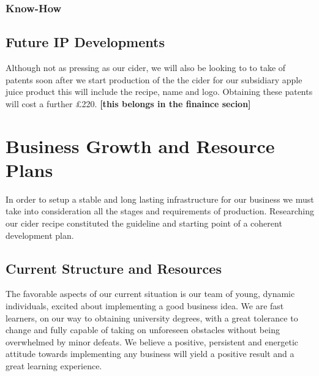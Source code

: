 \documentclass[11pt]{article}
\begin{document}
    \subsubsection{Know-How}

  \subsection{Future IP Developments}
Although not as pressing as our cider, we will also be looking to to take of patents soon after we start production of the the cider for our subsidiary apple juice product this will include the recipe, name and logo. Obtaining these patents will cost a further £220. \textbf{[this belongs in the finaince secion]}

\newpage
\section{Business Growth and Resource Plans}
In order to setup a stable and long lasting infrastructure for our business we must take into consideration all the stages and requirements of production. Researching our cider recipe constituted the guideline and starting point of a coherent development plan.

  \subsection{Current Structure and Resources}
The favorable aspects of our current situation is our team of young, dynamic individuals, excited about implementing a good business idea. We are fast learners, on our way to obtaining university degrees, with a great tolerance to change and fully capable of taking on unforeseen obstacles without being overwhelmed by minor defeats. We believe a positive, persistent and energetic attitude towards implementing any business will yield a positive result and a great learning experience.
\end{document}
